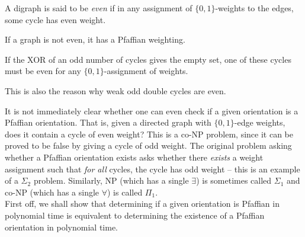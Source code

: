 


\begin{fdef}
	A digraph is said to be \emph{even} if in any assignment of $\{0,1\}$-weights to the edges, some cycle has even weight.
\end{fdef}

If a graph is not even, it has a Pfaffian weighting.

\begin{fprop}
	\label{prop:1}
	If the XOR of an odd number of cycles gives the empty set, one of these cycles must be even for any $\{0,1\}$-assignment of weights.
\end{fprop}
This is also the reason why weak odd double cycles are even.

It is not immediately clear whether one can even check if a given orientation is a Pfaffian orientation. That is, given a directed graph with $\{0,1\}$-edge weights, does it contain a cycle of even weight? This is a co-\textsf{NP} problem, since it can be proved to be false by giving a cycle of odd weight. The original problem asking whether a Pfaffian orientation exists asks whether there \emph{exists} a weight assignment such that \emph{for all} cycles, the cycle has odd weight -- this is an example of a $\Sigma_2$ problem. Similarly, \textsf{NP} (which has a single $\exists$) is sometimes called $\Sigma_1$ and co-\textsf{NP} (which has a single $\forall$) is called $\Pi_1$.\\

First off, we shall show that determining if a given orientation is Pfaffian in polynomial time is equivalent to determining the existence of a Pfaffian orientation in polynomial time. 


